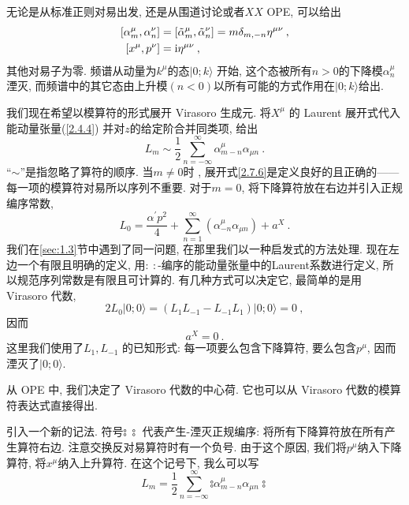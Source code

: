 无论是从标准正则对易出发, 还是从围道讨论或者$XX$ OPE, 可以给出
\begin{subequations} \label{2.7.5}
\begin{align}
[\alpha_{m}^{\mu}, \alpha_{n}^{\nu}] &= [\tilde{\alpha}_{m}^{\mu}, \tilde{\alpha}_{n}^{\nu}]=m \delta_{m,-n} \eta^{\mu \nu} \:, \label{2.7.5a} \\
[x^{\mu}, p^{\nu}] &= \mathrm{i} \eta^{\mu \nu} \:, \label{2.7.5b}  
\end{align}
\end{subequations}
其他对易子为零. 频谱从动量为$k^\mu$的态$\lvert 0 ; k\rangle$ 开始, 这个态被所有$n>0$的下降模$\alpha_n^\mu$湮灭, 而频谱中的其它态由上升模$(n<0)$以所有可能的方式作用在$\lvert 0 ; k\rangle$给出. 

我们现在希望以模算符的形式展开 Virasoro 生成元. 将$X^\mu$ 的 Laurent 展开式代入能动量张量(\ref{2.4.4}) 并对$z$的给定阶合并同类项, 给出
\begin{equation}\label{2.7.6}
L_{m} \sim \frac{1}{2} \sum_{n=-\infty}^{\infty} \alpha_{m-n}^{\mu} \alpha_{\mu n} \:.
\end{equation}
``$\sim$''是指忽略了算符的顺序. 当$m\neq 0$时 , 展开式\eqref{2.7.6}是定义良好的且正确的——每一项的模算符对易所以序列不重要. 对于$m=0$, 
将下降算符放在右边并引入正规编序常数,
\begin{equation}
 	L_{0}=\frac{\alpha^{\prime} p^{2}}{4}+\sum_{n=1}^{\infty}\left(\alpha_{-n}^{\mu} \alpha_{\mu n}\right)+a^{X} \:. \label{2.7.7}
\end{equation}
我们在\ref{sec:1.3}节中遇到了同一问题, 在那里我们以一种启发式的方法处理. 现在左边一个有限且明确的定义, 用$\mathrel{:\::}$-编序的能动量张量中的Laurent系数进行定义, 所以规范序列常数是有限且可计算的. 有几种方式可以决定它, 最简单的是用 Virasoro 代数,
 \begin{equation}\label{2.7.8}
 2 L_{0}|0 ; 0\rangle=(L_{1} L_{-1}-L_{-1} L_{1})|0 ; 0\rangle=0  \:,
 \end{equation}
因而
 \begin{equation}
 a^{X}=0 \:. \label{2.7.9}
 \end{equation}
这里我们使用了$L_1, L_{-1}$ 的已知形式: 每一项要么包含下降算符, 要么包含$p^\mu$, 因而湮灭了$|0 ; 0\rangle$. 

从 OPE 中, 我们决定了 Virasoro 代数的中心荷. 它也可以从 Virasoro 代数的模算符表达式直接得出.

引入一个新的记法. 符号$ \mathrel{\typecolon \:\typecolon}$ 代表产生-湮灭正规编序: 将所有下降算符放在所有产生算符右边. 注意交换反对易算符时有一个负号. 
由于这个原因, 我们将$p^\mu$纳入下降算符, 将$x^\mu$纳入上升算符. 在这个记号下, 我么可以写
\begin{equation}\label{2.7.10}
L_{m}=\frac{1}{2} \sum_{n=-\infty}^{\infty}\mathrel{ \typecolon\alpha_{m-n}^{\mu} \alpha_{\mu n}\typecolon}
\end{equation}


